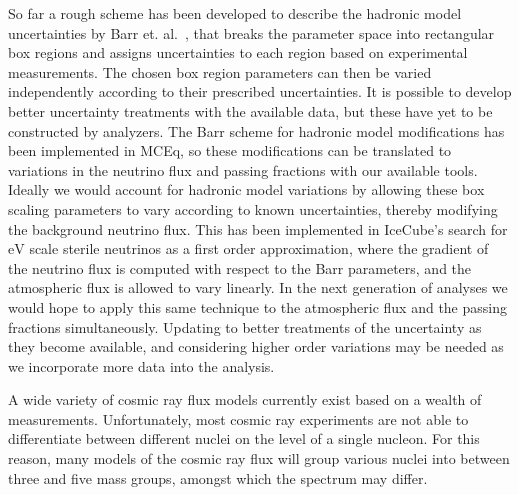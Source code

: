 So far a rough scheme has been developed to describe the hadronic model uncertainties by Barr et. al.~\cite{Barr:2004br}, that breaks the parameter space into rectangular box regions and assigns uncertainties to each region based on experimental measurements.
The chosen box region parameters can then be varied independently according to their prescribed uncertainties.
It is possible to develop better uncertainty treatments with the available data, but these have yet to be constructed by analyzers.
The Barr scheme for hadronic model modifications has been implemented in MCEq, so these modifications can be translated to variations in the neutrino flux and passing fractions with our available tools.
Ideally we would account for hadronic model variations by allowing these box scaling parameters to vary according to known uncertainties, thereby modifying the background neutrino flux.
This has been implemented in IceCube's search for $\si\eV$ scale sterile neutrinos as a first order approximation, where the gradient of the neutrino flux is computed with respect to the Barr parameters, and the atmospheric flux is allowed to vary linearly.
In the next generation of analyses we would hope to apply this same technique to the atmospheric flux and the passing fractions simultaneously.
Updating to better treatments of the uncertainty as they become available, and considering higher order variations may be needed as we incorporate more data into the analysis.

A wide variety of cosmic ray flux models currently exist based on a wealth of measurements.
Unfortunately, most cosmic ray experiments are not able to differentiate between different nuclei on the level of a single nucleon.
For this reason, many models of the cosmic ray flux will group various nuclei into between three and five mass groups, amongst which the spectrum may differ.

